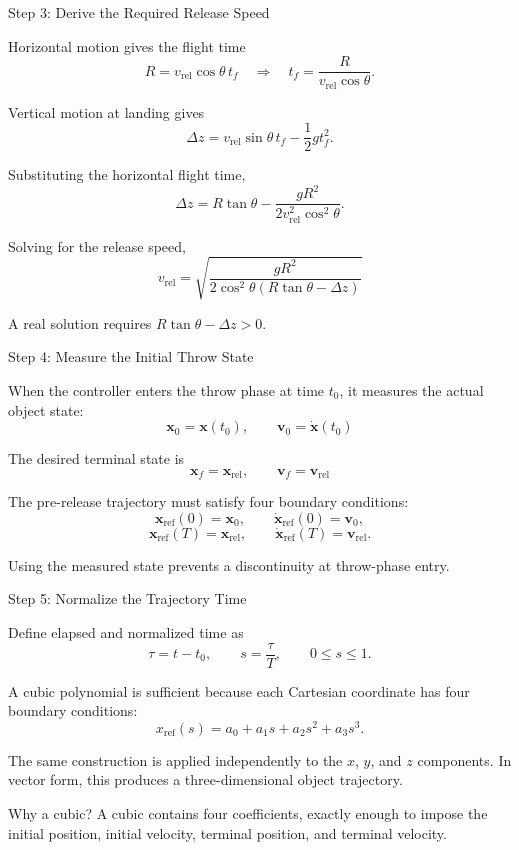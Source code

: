 \documentclass[aspectratio=169]{beamer}
\newcommand{\vect}[1]{\bm{#1}}
\begin{document}
\begin{frame}{Step 3: Derive the Required Release Speed}

Horizontal motion gives the flight time
\[
R=v_{\mathrm{rel}}\cos\theta\,t_f
\quad\Longrightarrow\quad
t_f=\frac{R}{v_{\mathrm{rel}}\cos\theta}.
\]

Vertical motion at landing gives
\[
\Delta z
=v_{\mathrm{rel}}\sin\theta\,t_f
-\frac{1}{2}gt_f^2.
\]

Substituting the horizontal flight time,
\[
\Delta z
=R\tan\theta
-\frac{gR^2}{2v_{\mathrm{rel}}^2\cos^2\theta}.
\]

Solving for the release speed,
\[
\boxed{
v_{\mathrm{rel}}
=\sqrt{
\frac{gR^2}
{2\cos^2\theta\left(R\tan\theta-\Delta z\right)}
}
}
\]

A real solution requires
$R\tan\theta-\Delta z>0$.

\end{frame}

\begin{frame}{Step 4: Measure the Initial Throw State}

When the controller enters the throw phase at time $t_0$, it measures
the actual object state:
\[
\boxed{
\vect{x}_0=\vect{x}(t_0),
\qquad
\vect{v}_0=\dot{\vect{x}}(t_0)
}
\]

The desired terminal state is
\[
\boxed{
\vect{x}_f=\vect{x}_{\mathrm{rel}},
\qquad
\vect{v}_f=\vect{v}_{\mathrm{rel}}
}
\]

The pre-release trajectory must satisfy four boundary conditions:
\[
\vect{x}_{\mathrm{ref}}(0)=\vect{x}_0,
\qquad
\dot{\vect{x}}_{\mathrm{ref}}(0)=\vect{v}_0,
\]
\[
\vect{x}_{\mathrm{ref}}(T)=\vect{x}_{\mathrm{rel}},
\qquad
\dot{\vect{x}}_{\mathrm{ref}}(T)=\vect{v}_{\mathrm{rel}}.
\]

Using the measured state prevents a discontinuity at throw-phase entry.

\end{frame}

\begin{frame}{Step 5: Normalize the Trajectory Time}

Define elapsed and normalized time as
\[
\tau=t-t_0,
\qquad
s=\frac{\tau}{T},
\qquad 0\leq s\leq 1.
\]

A cubic polynomial is sufficient because each Cartesian coordinate has
four boundary conditions:
\[
x_{\mathrm{ref}}(s)=a_0+a_1s+a_2s^2+a_3s^3.
\]

The same construction is applied independently to the $x$, $y$, and $z$
components. In vector form, this produces a three-dimensional object
trajectory.

\begin{block}{Why a cubic?}
A cubic contains four coefficients, exactly enough to impose the initial
position, initial velocity, terminal position, and terminal velocity.
\end{block}

\end{frame}
\end{document}
